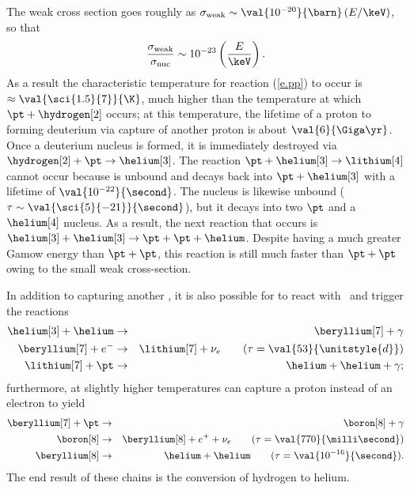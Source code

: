 The weak cross section goes roughly as $\sigma_{\mathrm{weak}} \sim \val{10^{-20}}{\barn}\left(E/\keV\right)$, so that
\[ \frac{\sigma_{\mathrm{weak}}}{\sigma_{\mathrm{nuc}}} \sim 10^{-23}\left(\frac{E}{\keV}\right). \]
As a result the characteristic temperature for reaction (\ref{e.pp}) to occur is $\approx \val{\sci{1.5}{7}}{\K}$, much higher than the temperature at which $\pt+\hydrogen[2]$ occurs; at this temperature, the lifetime of a proton to forming deuterium via capture of another proton is about $\val{6}{\Giga\yr}$.
Once a deuterium nucleus is formed, it is immediately destroyed via $\hydrogen[2]+\pt\to\helium[3]$. The reaction $\pt + \helium[3]\to\lithium[4]$ cannot occur because \lithium[4] is unbound and decays back into $\pt+\helium[3]$ with a lifetime of $\val{10^{-22}}{\second}$. 
The nucleus \beryllium[6] is likewise unbound ($\tau \sim \val{\sci{5}{-21}}{\second}$), but it decays into two $\pt$ and a $\helium[4]$ nucleus. As a result, the next reaction that occurs is $\helium[3]+\helium[3]\to \pt+\pt+\helium$. Despite having a much greater Gamow energy than $\pt + \pt$, this reaction is still much faster than $\pt+\pt$ owing to the small weak cross-section.

In addition to capturing another \helium[3], it is also possible for \helium[3] to react with \helium\ and trigger the reactions
\begin{eqnarray}
\helium[3] + \helium &\to& \beryllium[7] + \gamma\nonumber\\
 \beryllium[7] + e^{-} &\to& \lithium[7] +  \nu_{e}\qquad(\tau=\val{53}{\unitstyle{d}})\nonumber \\
 \lithium[7] + \pt &\to& \helium+\helium + \gamma;
\label{e.pp-2}
\end{eqnarray}
furthermore, at slightly higher temperatures \beryllium[7] can capture a proton instead of an electron to yield
\begin{eqnarray}
\beryllium[7] + \pt &\to& \boron[8] + \gamma\nonumber\\
\boron[8] &\to& \beryllium[8] + e^{+} + \nu_{e}\qquad(\tau = \val{770}{\milli\second})\nonumber\\
\beryllium[8] &\to& \helium+\helium\qquad(\tau= \val{10^{-16}}{\second}).
\label{e.pp-3}
\end{eqnarray}
The end result of these chains is the conversion of hydrogen to helium. 

